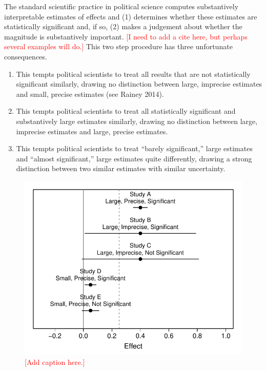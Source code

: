 \documentclass[12pt]{article}
\newcommand{\comment}[1]{\textcolor{red}{#1}}
\begin{document}
The standard scientific practice in political science computes substantively interpretable estimates of effects and (1) determines whether these estimates are statistically significant and, if so, (2) makes a judgement about whether the magnitude is substantively important. \comment{[I need to add a cite here, but perhaps several examples will do.]} This two step procedure has three unfortunate consequences.

\begin{enumerate}
\item This tempts political scientists to treat all results that are not statistically significant similarly, drawing no distinction between large, imprecise estimates and small, precise estimates (see Rainey 2014).
\item This tempts political scientists to treat all statistically significant and substantively large estimates similarly, drawing no distinction between large, imprecise estimates and large, precise estimates.
\item This tempts political scientists to treat ``barely significant,'' large estimates and ``almost significant,'' large estimates quite differently, drawing a strong distinction between two similar estimates with similar uncertainty.
\end{enumerate}

\begin{figure}[h]
\begin{center}
\includegraphics[scale = .6]{figs/example-cis.pdf}
\caption{\comment{[Add caption here.]}}\label{fig:logit}
\end{center}
\end{figure}
\end{document}
